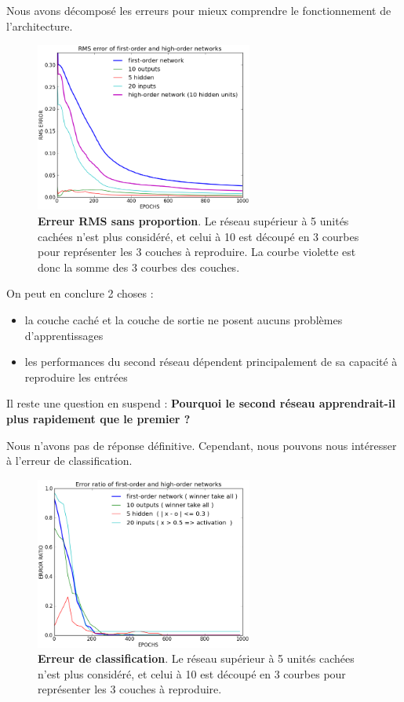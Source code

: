 \documentclass[a4paper,12pt, twoside]{article}
\begin{document}
Nous avons décomposé les erreurs pour mieux comprendre le fonctionnement de l'architecture.

\begin{figure}[H]
\begin{center}
 \includegraphics[width=270px]{../cleeremans_2007/digit_reco/rms_ffa.png}
\end{center}
\caption{ \textbf{Erreur RMS sans proportion}. Le réseau supérieur à 5 unités cachées n'est plus considéré, et celui à 
10 est découpé en 3 courbes pour représenter les 3 couches à reproduire. La courbe violette est donc la somme des 3 courbes des 
couches.}
\end{figure}

On peut en conclure 2 choses :
\begin{itemize}
 \item la couche caché et la couche de sortie ne posent aucuns problèmes d'apprentissages
 \item les performances du second réseau dépendent principalement de sa capacité à reproduire les entrées
\end{itemize}

Il reste une question en suspend :
\newline
\textbf{Pourquoi le second réseau apprendrait-il plus rapidement que le premier ?}

Nous n'avons pas de réponse définitive. Cependant, nous pouvons nous intéresser à l'erreur de classification.

\begin{figure}[H]
\begin{center}
 \includegraphics[width=270px]{../cleeremans_2007/digit_reco/err_ffa.png}
\end{center}
\caption{ \textbf{Erreur de classification}. Le réseau supérieur à 5 unités cachées n'est plus considéré, et celui à
10 est découpé en 3 courbes pour représenter les 3 couches à reproduire.}
\end{figure}
\end{document}
